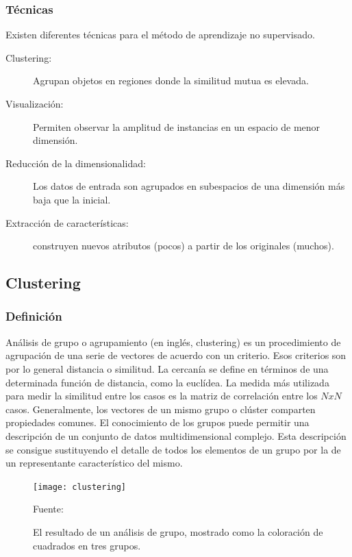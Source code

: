\subsubsection{Técnicas}
Existen diferentes técnicas para el método de aprendizaje no supervisado.

\begin{description}
	\item[Clustering:] Agrupan objetos en regiones donde la similitud mutua es elevada.
	\item[Visualización:] Permiten observar la amplitud de instancias en un espacio de menor dimensión.
	\item[Reducción de la dimensionalidad:] Los datos de entrada son agrupados en subespacios de una dimensión más baja que la inicial.
	\item[Extracción de características:] construyen nuevos atributos (pocos) a partir de los originales (muchos).
\end{description}


\subsection{Clustering}

\subsubsection{Definición}

Análisis de grupo o agrupamiento (en inglés, clustering) es un procedimiento de agrupación de una serie de vectores de acuerdo con un criterio. Esos criterios son por lo general distancia o similitud. La cercanía se define en términos de una determinada función de distancia, como la euclídea. La medida más utilizada para medir la similitud entre los casos es la matriz de correlación entre los \( N x N \) casos.
\vskip 1cm
Generalmente, los vectores de un mismo grupo o clúster comparten propiedades comunes. El conocimiento de los grupos puede permitir una descripción de un conjunto de datos multidimensional complejo. Esta descripción se consigue sustituyendo el detalle de todos los elementos de un grupo por la de un representante característico del mismo.

\begin{figure}[ht]
	\begin{center}
		\texttt{[image: clustering]}
	\end{center}
	\begin{center}
		\vskip -0.5cm
		\caption{\small{El resultado de un análisis de grupo, mostrado como la coloración de cuadrados en tres grupos.}}
		{\small{Fuente: }}
	\end{center}
\end{figure}

